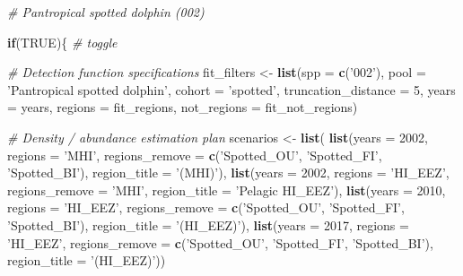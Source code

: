 \documentclass[
]{book}
\newenvironment{Shaded}{\begin{snugshade}}{\end{snugshade}}
\newcommand{\CommentTok}[1]{\textcolor[rgb]{0.56,0.35,0.01}{\textit{#1}}}
\newcommand{\ControlFlowTok}[1]{\textcolor[rgb]{0.13,0.29,0.53}{\textbf{#1}}}
\newcommand{\DataTypeTok}[1]{\textcolor[rgb]{0.13,0.29,0.53}{#1}}
\newcommand{\DecValTok}[1]{\textcolor[rgb]{0.00,0.00,0.81}{#1}}
\newcommand{\KeywordTok}[1]{\textcolor[rgb]{0.13,0.29,0.53}{\textbf{#1}}}
\newcommand{\NormalTok}[1]{#1}
\newcommand{\OtherTok}[1]{\textcolor[rgb]{0.56,0.35,0.01}{#1}}
\newcommand{\StringTok}[1]{\textcolor[rgb]{0.31,0.60,0.02}{#1}}
\begin{document}
\begin{Shaded}
\begin{Highlighting}[]
\CommentTok{# Pantropical spotted dolphin (002)}

\ControlFlowTok{if}\NormalTok{(}\OtherTok{TRUE}\NormalTok{)\{ }\CommentTok{# toggle}

  \CommentTok{# Detection function specifications}
\NormalTok{  fit_filters <-}
\StringTok{    }\KeywordTok{list}\NormalTok{(}\DataTypeTok{spp =} \KeywordTok{c}\NormalTok{(}\StringTok{'002'}\NormalTok{),}
         \DataTypeTok{pool =} \StringTok{'Pantropical spotted dolphin'}\NormalTok{,}
         \DataTypeTok{cohort =} \StringTok{'spotted'}\NormalTok{,}
         \DataTypeTok{truncation_distance =} \DecValTok{5}\NormalTok{,}
         \DataTypeTok{years =}\NormalTok{ years,}
         \DataTypeTok{regions =}\NormalTok{ fit_regions,}
         \DataTypeTok{not_regions =}\NormalTok{ fit_not_regions)}

  \CommentTok{# Density / abundance estimation plan}
\NormalTok{  scenarios <-}\StringTok{ }\KeywordTok{list}\NormalTok{(}
    \KeywordTok{list}\NormalTok{(}\DataTypeTok{years =} \DecValTok{2002}\NormalTok{,}
       \DataTypeTok{regions =} \StringTok{'MHI'}\NormalTok{,}
       \DataTypeTok{regions_remove =} \KeywordTok{c}\NormalTok{(}\StringTok{'Spotted_OU'}\NormalTok{, }\StringTok{'Spotted_FI'}\NormalTok{, }\StringTok{'Spotted_BI'}\NormalTok{),}
       \DataTypeTok{region_title =} \StringTok{'(MHI)'}\NormalTok{),}
    \KeywordTok{list}\NormalTok{(}\DataTypeTok{years =} \DecValTok{2002}\NormalTok{, }
         \DataTypeTok{regions =} \StringTok{'HI_EEZ'}\NormalTok{,}
         \DataTypeTok{regions_remove =} \StringTok{'MHI'}\NormalTok{,}
         \DataTypeTok{region_title =} \StringTok{'Pelagic HI_EEZ'}\NormalTok{),}
    \KeywordTok{list}\NormalTok{(}\DataTypeTok{years =} \DecValTok{2010}\NormalTok{,}
         \DataTypeTok{regions =} \StringTok{'HI_EEZ'}\NormalTok{,}
         \DataTypeTok{regions_remove =} \KeywordTok{c}\NormalTok{(}\StringTok{'Spotted_OU'}\NormalTok{, }\StringTok{'Spotted_FI'}\NormalTok{, }\StringTok{'Spotted_BI'}\NormalTok{),}
       \DataTypeTok{region_title =} \StringTok{'(HI_EEZ)'}\NormalTok{),}
    \KeywordTok{list}\NormalTok{(}\DataTypeTok{years =} \DecValTok{2017}\NormalTok{,}
         \DataTypeTok{regions =} \StringTok{'HI_EEZ'}\NormalTok{,}
         \DataTypeTok{regions_remove =} \KeywordTok{c}\NormalTok{(}\StringTok{'Spotted_OU'}\NormalTok{, }\StringTok{'Spotted_FI'}\NormalTok{, }\StringTok{'Spotted_BI'}\NormalTok{),}
       \DataTypeTok{region_title =} \StringTok{'(HI_EEZ)'}\NormalTok{))}
  

\end{Highlighting}
\end{Shaded}
\end{document}
